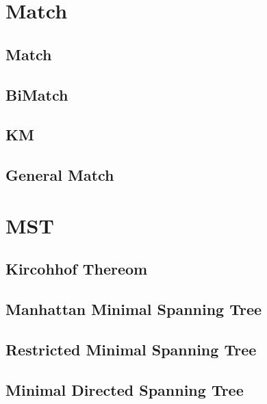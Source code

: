 \documentclass[10pt,twocolumn,oneside]{article}
\begin{document}
    \section{Match}
    \subsection{Match}
    
    \subsection{BiMatch}
    
    \subsection{KM}
    
    \subsection{General Match}
    

    \section{MST}
    \subsection{Kircohhof Thereom}
    
    \subsection{Manhattan Minimal Spanning Tree}
    
    \subsection{Restricted Minimal Spanning Tree}
    
    \subsection{Minimal Directed Spanning Tree}
    
\end{document}
